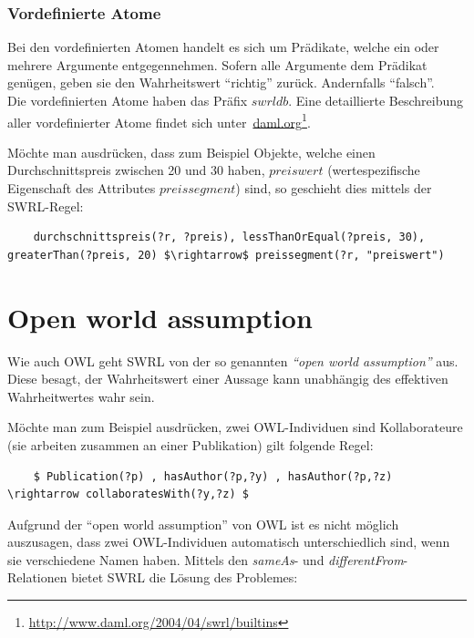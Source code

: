 \subsubsection{Vordefinierte Atome}
\label{ssubsec:swrl_aufbau_atomaretypen_vordefinierteatome}
Bei den vordefinierten Atomen handelt es sich um Prädikate, welche ein oder mehrere Argumente entgegennehmen. Sofern alle Argumente dem Prädikat genügen, geben sie den Wahrheitswert ``richtig'' zurück. Andernfalls ``falsch''.\\
Die vordefinierten Atome haben das Präfix $swrldb$. Eine detaillierte Beschreibung aller vordefinierter Atome findet sich unter~\href{http://www.daml.org/2004/04/swrl/builtins}{daml.org}\footnote{\url{http://www.daml.org/2004/04/swrl/builtins}}.

Möchte man ausdrücken, dass zum Beispiel Objekte, welche einen Durchschnittspreis zwischen 20 und 30 haben, $preiswert$ (wertespezifische Eigenschaft des Attributes $preissegment$) sind, so geschieht dies mittels der SWRL-Regel:
\lstset{language=XML}
\begin{lstlisting}
    durchschnittspreis(?r, ?preis), lessThanOrEqual(?preis, 30), greaterThan(?preis, 20) $\rightarrow$ preissegment(?r, "preiswert")
\end{lstlisting}

\newpage

\section{Open world assumption}
\label{sec:swrl_openworldassumption}
Wie auch OWL geht SWRL von der so genannten \textit{``open world assumption''} aus. Diese besagt, der Wahrheitswert einer Aussage kann unabhängig des effektiven Wahrheitwertes wahr sein.

Möchte man zum Beispiel ausdrücken, zwei OWL-Individuen sind Kollaborateure (sie arbeiten zusammen an einer Publikation) gilt folgende Regel:

\lstset{language=XML}
\begin{lstlisting}
    $ Publication(?p) , hasAuthor(?p,?y) , hasAuthor(?p,?z) \rightarrow collaboratesWith(?y,?z) $
\end{lstlisting}

Aufgrund  der ``open world assumption'' von OWL ist es nicht möglich auszusagen, dass zwei OWL-Individuen automatisch unterschiedlich sind, wenn sie verschiedene Namen haben. Mittels den \textit{sameAs}- und \textit{differentFrom}-Relationen bietet SWRL die Lösung des Problemes:

